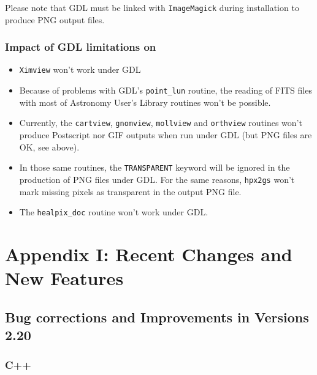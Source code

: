 \documentclass[12pt,twoside]{article}
\begin{document}
Please note that GDL must be linked with {\tt ImageMagick} during installation to produce PNG
output files.

\subsubsection{Impact of GDL limitations on \healpix}
\begin{itemize}
\item {\tt Ximview} won't work under GDL \gdlversion
\item Because of problems with GDL's {\tt point\_lun} routine, the reading of
FITS files with most of Astronomy User's Library routines won't be possible.
\item Currently, the 
{\tt cartview},
{\tt gnomview},
{\tt mollview} and  
{\tt orthview} 
routines won't produce Postscript nor GIF outputs when run under GDL (but PNG
files are OK, see above).
\item In those same routines, the {\tt TRANSPARENT} keyword will be ignored in the
production of PNG files under GDL. For the same reasons, {\tt hpx2gs} won't mark missing pixels as
transparent in the output PNG file.
\item The {\tt healpix\_doc} routine won't work under GDL.
\end{itemize}


\vfill\newpage
\section{Appendix I: Recent Changes and New Features}
\label{sec:newfeatures}

\subsection{Bug corrections and Improvements in Versions 2.20} %

\subsubsection[C++]{C++}
\end{document}
